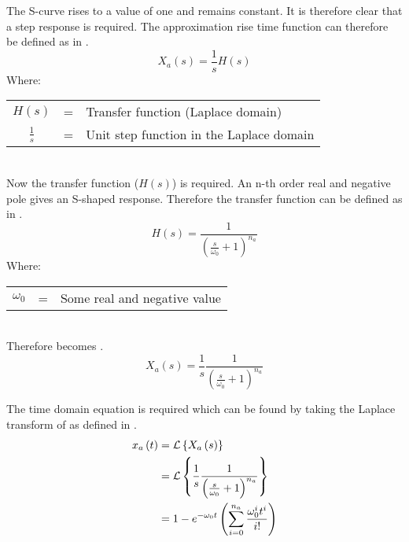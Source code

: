 The S-curve rises to a value of one and remains constant. It is therefore clear that a step response is required. The approximation rise time function can therefore be defined as in .
\begin{equation}
    X_a \left( s \right) = \frac{1}{s} H \left( s \right)
    \label{eqn:app_approx_rise_laplace}
\end{equation}
Where: \\
\begin{tabular}{cll}
    $H \left( s \right)$ & = & Transfer function (Laplace domain) \\
    $\frac{1}{s}$ & = & Unit step function in the Laplace domain
\end{tabular}\\
Now the transfer function ($H \left( s \right)$) is required. An n-th order real and negative pole gives an S-shaped response. Therefore the transfer function can be defined as in .
\begin{equation}
    H \left( s \right) = \frac{1}{\left( \frac{s}{\omega_0} + 1 \right)^{n_a}}
    \label{eqn:app_tf_func}
\end{equation}
Where: \\
\begin{tabular}{cll}
    $\omega_0$ & = & Some real and negative value
\end{tabular}\\
Therefore  becomes .
\begin{equation}
    X_a \left( s \right) = \frac{1}{s} \frac{1}{\left( \frac{s}{\omega_0} + 1 \right)^{n_a}}
    \label{eqn:app_approx_rise_laplace_final}
\end{equation}

The time domain equation is required which can be found by taking the Laplace transform of  as defined in .
\begin{align}
    x_a \left( t \right) & = \mathcal{L} \left \{ X_a \left( s \right) \right \} \notag\\
     & = \mathcal{L} \left \{ \frac{1}{s} \frac{1}{\left( \frac{s}{\omega_0} + 1 \right)^{n_a}} \right \} \notag\\
     & = 1 - e^{-\omega_0 t} \left ( \sum\limits_{i=0}^{n_a} \frac{\omega_0^i t^i}{i!} \right )
    \label{eqn:app_approx_rise}
\end{align}

